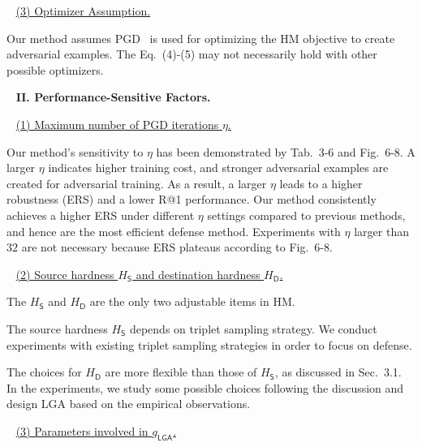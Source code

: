 ~\newline
\noindent \ul{(3) Optimizer Assumption.}

Our method assumes PGD~\cite{madry} is used for optimizing the HM objective
to create adversarial examples.
%
The Eq.~(4)-(5) may not necessarily hold with other possible optimizers.

~\newline
\noindent\textbf{II. Performance-Sensitive Factors.}

~\newline
\noindent \ul{(1) Maximum number of PGD iterations $\eta$.}

Our method's sensitivity to $\eta$ has been demonstrated by Tab.~3-6 and
Fig.~6-8.
%
A larger $\eta$ indicates higher training cost, and stronger adversarial
examples are created for adversarial training.
%
As a result, a larger $\eta$ leads to a higher robustness (ERS) and a lower
R@1 performance.
%
Our method consistently achieves a higher ERS under different $\eta$ settings
compared to previous methods, and hence are the most efficient defense method.
%
Experiments with $\eta$ larger than $32$ are not necessary because ERS plateaus
according to Fig.~6-8.

~\newline
\noindent \ul{(2) Source hardness $H_\mathsf{S}$ and destination hardness
$H_\mathsf{D}$.}

The $H_\mathsf{S}$ and $H_\mathsf{D}$ are the only two adjustable items in HM.

The source hardness $H_\mathsf{S}$ depends on triplet sampling strategy.
%
We conduct experiments with existing triplet sampling strategies in order to
focus on defense.

The choices for $H_\mathsf{D}$ are more flexible than those of $H_\mathsf{S}$,
as discussed in Sec.~3.1.
%
In the experiments, we study some possible choices following the discussion and
design LGA based on the empirical observations.

~\newline
\noindent\ul{(3) Parameters involved in $g_\mathsf{LGA}$.}

